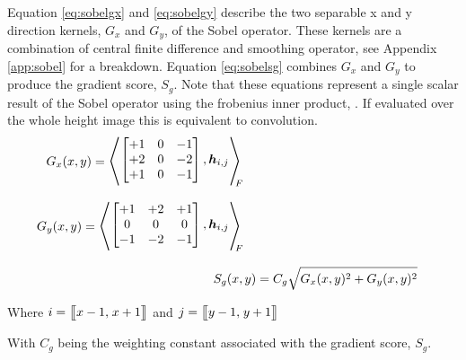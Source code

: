         \newpage
        \noindent
        Equation \ref{eq:sobelgx} and \ref{eq:sobelgy} describe the two separable x and y direction kernels, \(G_x\) and \(G_y\),
        of the Sobel operator. These kernels are a combination of central finite difference and smoothing operator, see Appendix \ref{app:sobel} 
        for a breakdown. Equation \ref{eq:sobelsg} combines \(G_x\) and \(G_y\) to produce the gradient score, \(S_g\). Note that these equations represent
        a single scalar result of the Sobel operator using the frobenius inner product, \cite{horn2012matrix}. If evaluated over the whole height image this is equivalent
        to convolution.
        \begin{align}
            \begin{split} \label{eq:sobelgx}
                G_x(x,y) &= 
                        \sbox0{$
                        \begin{bmatrix}
                            +1 & 0 & -1\\
                            +2 & 0 & -2\\
                            +1 & 0 & -1
                        \end{bmatrix}
                        ,\boldsymbol{h}_{i,j}
                        $}
                        \mathopen{\resizebox{1.2\width}{1.1\ht0}{$\Bigg\langle$}}
                        \raisebox{0.08\ht0}{\usebox{0}}
                        \mathclose{\resizebox{1.2\width}{1.1\ht0}{$\Bigg\rangle$}}_{\mkern-10mu F}
            \end{split}\\[0.3cm]
            \begin{split} \label{eq:sobelgy}
                G_y(x,y) &= 
                        \sbox0{$
                        \begin{bmatrix}
                            +1 & +2 & +1\\
                            0 & 0 & 0\\
                            -1 & -2 & -1
                        \end{bmatrix}
                        ,\boldsymbol{h}_{i,j}
                        $}
                        \mathopen{\resizebox{1.2\width}{1.1\ht0}{$\Bigg\langle$}}
                        \raisebox{0.08\ht0}{\usebox{0}}
                        \mathclose{\resizebox{1.2\width}{1.1\ht0}{$\Bigg\rangle$}}_{\mkern-10mu F}
            \end{split}\\[0.3cm]
            S_g(x,y) &= C_g\sqrt{G_x(x,y)^2 + G_y(x,y)^2} \label{eq:sobelsg}
        \end{align}
        \begin{center}
            Where \(i = \big[\mkern-4.7mu\big[x-1,\mkern2mu x+1\big]\mkern-4.7mu\big]\) and \(j = \big[\mkern-4.7mu\big[y-1,\mkern2mu y+1\big]\mkern-4.7mu\big]\)
        \end{center}
        \noindent
        With \(C_g\) being the weighting constant associated with the gradient score, \(S_g\).
        

